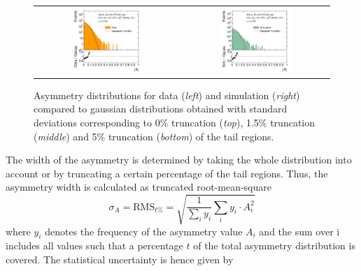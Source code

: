 \begin{figure}[!htp]
\begin{tabular}{cc}
                \includegraphics[width=0.49\textwidth]{figures/AsymmHistosDataWithRatio_Eta0_pt5_alpha2_final_nominal_95Truncation_v4.pdf} &
                \includegraphics[width=0.49\textwidth]{figures/AsymmHistosSimWithRatio_Eta0_pt5_alpha2_final_nominal_95Truncation_v4.pdf} \\
  \end{tabular}
  \caption{Asymmetry distributions for data (\textit{left}) and simulation (\textit{right}) compared to gaussian distributions obtained with standard deviations corresponding to 0\% truncation (\textit{top}), 1.5\% truncation (\textit{middle}) and 5\% truncation (\textit{bottom}) of the tail regions.}
  \label{fig:asymm_width}
\end{figure}
The width of the asymmetry is determined by taking the whole distribution into account or by truncating a certain percentage of the tail regions. Thus, the asymmetry width is calculated as truncated root-mean-square
\begin{equation}
 \sigma_A = \mathrm{RMS}_{t\%} = \sqrt{\frac{1}{\sum_{i} y_i} \sum_{i} y_i \cdot A_i^2}  
 \label{eq:truncated_rms}
\end{equation} 
where $y_i$ denotes the frequency of the asymmetry value $A_i$ and the sum over i includes all values such that a percentage $t$ of the total asymmetry distribution is covered. The statistical uncertainty is hence given by
